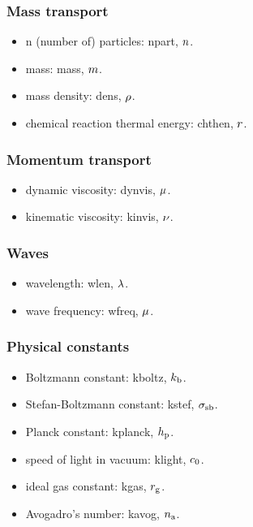 \subsubsection{Mass transport}
\begin{itemize}
\item n (number of) particles: npart, $n$.
\item mass: mass, $m$.
\item mass density: dens, $\rho$.
\item chemical reaction thermal energy: chthen, $r$.
\end{itemize}

\subsubsection{Momentum transport}
\begin{itemize}
\item dynamic viscosity: dynvis, $\mu$.
\item kinematic viscosity: kinvis, $\nu$.
\end{itemize}


\subsubsection{Waves}
\begin{itemize}
\item wavelength: wlen, $\lambda$.
\item wave frequency: wfreq, $\mu$.
\end{itemize}


\subsubsection{Physical constants}
\begin{itemize}
\item Boltzmann constant: kboltz, $k_\text{b}$.
\item Stefan-Boltzmann constant: kstef, $\sigma_\text{sb}$.
\item Planck constant: kplanck, $h_\text{p}$.
\item speed of light in vacuum: klight, $c_0$.
\item ideal gas constant: kgas, $r_\text{g}$.
\item Avogadro's number: kavog, $n_\text{a}$.
\end{itemize}


